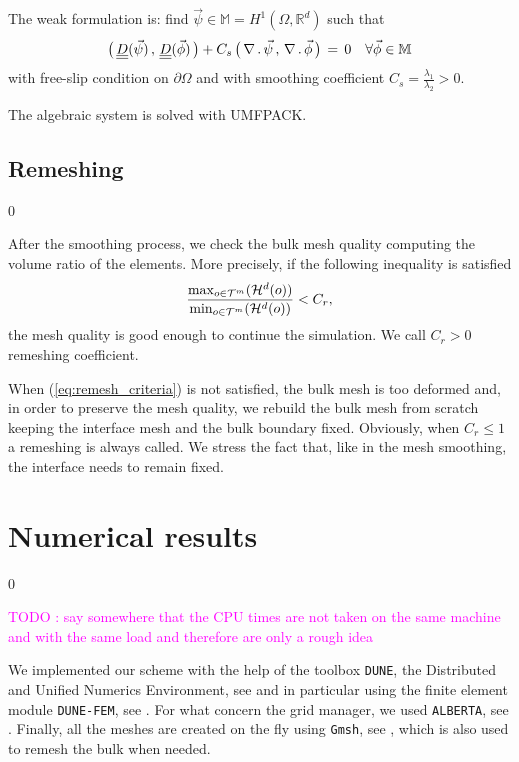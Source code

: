 \documentclass[a4paper,12pt,onecolumn]{article}
\newcommand{\R}{{\mathbb R}}
\newcommand{\sigmaO}{o}
\newcommand{\mat}[1]{\underline{\underline{#1}}\rule{0pt}{0pt}}
\begin{document}
The weak formulation is: find $\vec\psi\in \mathbb{M}= H^1(\Omega, \R^d)$ such that
\begin{equation}
 \big(\,\mat D(\vec\psi)\,,\,\mat D (\vec \phi)\,\big)+ C_s\,\big(\, \nabla\,.\,\vec \psi\,,\,\nabla\,.\,\vec\phi\,\big)\, =\, 0\quad \forall \vec \phi \in\mathbb{M}
\end{equation}
with free-slip condition on $\partial\Omega$ and with smoothing coefficient $C_s=\frac{\lambda_1}{\lambda_2}>0$.

The algebraic system is solved with UMFPACK.

\subsection{Remeshing} \label{subsec:remeshing}
\setcounter{equation} 0

After the smoothing process, we check the bulk mesh quality computing the volume ratio of the elements. More precisely, if the following inequality is satisfied
\begin{equation}\label{eq:remesh_criteria}
\frac{\max_{\sigmaO\in {\cal T}^m}(\mathcal{H}^{d}(\sigmaO))}{\min_{\sigmaO\in\mathcal {T}^m}(\mathcal{H}^{d}(\sigmaO))}<C_r,
\end{equation}
the mesh quality is good enough to continue the simulation. We call $C_r>0$ remeshing coefficient. 

When (\ref{eq:remesh_criteria}) is not satisfied, the bulk mesh is too deformed and, in order to preserve the mesh quality, we rebuild the bulk mesh from scratch keeping the interface mesh and the bulk boundary fixed. Obviously, when $C_r\leq 1$ a remeshing is always called. We stress the fact that, like in the mesh smoothing, the interface needs to remain fixed.

\section{Numerical results} \label{sec:numerical_results}
\setcounter{equation} 0

\textcolor{magenta}{TODO : say somewhere that the CPU times are not taken on the same machine and with the same load and therefore are only a rough idea}

We implemented our scheme with the help of the toolbox \verb|DUNE|, the Distributed and Unified Numerics Environment, see \cite{ISTL,ISTLParallel,dunegridpaperI08,dunegridpaperII08,dune-web-page} and in particular using the finite element module \verb|DUNE-FEM|, see \cite{dunefempaper10,dunefem-web-page}. For what concern the grid manager, we used \verb|ALBERTA|, see \cite{Alberta,alberta-web-page}. Finally, all the meshes are created on the fly using \verb|Gmsh|, see \cite{GeuzaineR09,gmsh-web-page}, which is also used to remesh the bulk when needed.
\end{document}
